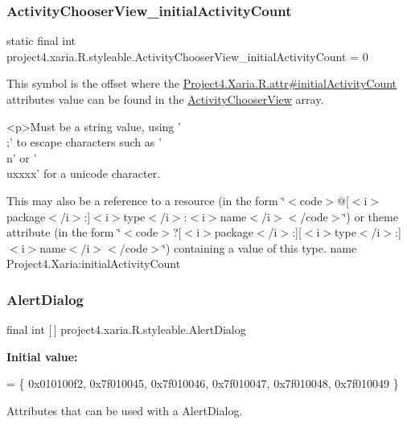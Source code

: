 \subsubsection{\texorpdfstring{Activity\+Chooser\+View\+\_\+initial\+Activity\+Count}{ActivityChooserView\_initialActivityCount}}
{\footnotesize\ttfamily static final int project4.\+xaria.\+R.\+styleable.\+Activity\+Chooser\+View\+\_\+initial\+Activity\+Count = 0\hspace{0.3cm}{\ttfamily [static]}}

This symbol is the offset where the \hyperlink{}{Project4.\+Xaria.\+R.\+attr\#initial\+Activity\+Count} attribute\textquotesingle{}s value can be found in the \hyperlink{classproject4_1_1xaria_1_1R_1_1styleable_a0e91fbde63d227499bc31d982f4a1131}{Activity\+Chooser\+View} array.

\begin{DoxyVerb}      <p>Must be a string value, using '\\;' to escape characters such as '\\n' or '\\uxxxx' for a unicode character.
\end{DoxyVerb}
 

This may also be a reference to a resource (in the form \char`\"{}$<$code$>$@\mbox{[}$<$i$>$package$<$/i$>$\+:\mbox{]}$<$i$>$type$<$/i$>$\+:$<$i$>$name$<$/i$>$$<$/code$>$\char`\"{}) or theme attribute (in the form \char`\"{}$<$code$>$?\mbox{[}$<$i$>$package$<$/i$>$\+:\mbox{]}\mbox{[}$<$i$>$type$<$/i$>$\+:\mbox{]}$<$i$>$name$<$/i$>$$<$/code$>$\char`\"{}) containing a value of this type.  name Project4.\+Xaria\+:initial\+Activity\+Count \mbox{\label{classproject4_1_1xaria_1_1R_1_1styleable_a03310da91bbeadbad8196e09427a2ba7}} 
\subsubsection{\texorpdfstring{Alert\+Dialog}{AlertDialog}}
{\footnotesize\ttfamily final int \mbox{[}$\,$\mbox{]} project4.\+xaria.\+R.\+styleable.\+Alert\+Dialog\hspace{0.3cm}{\ttfamily [static]}}

{\bfseries Initial value\+:}
\begin{DoxyCode}
= \{
            0x010100f2, 0x7f010045, 0x7f010046, 0x7f010047,
            0x7f010048, 0x7f010049
        \}
\end{DoxyCode}
Attributes that can be used with a Alert\+Dialog. 

